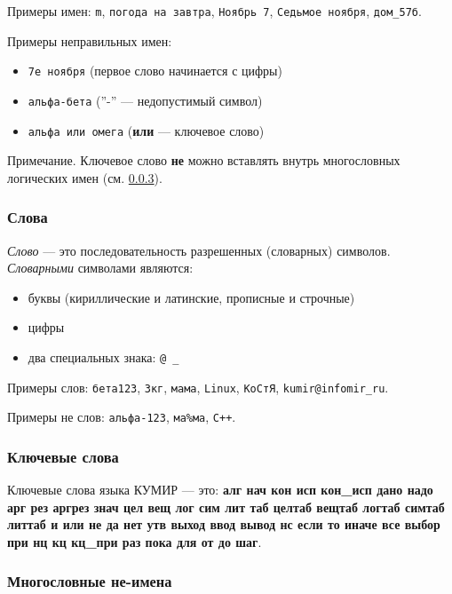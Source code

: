 \documentclass[12pt,a4paper]{article}
\begin{document}
Примеры имен: \texttt{m}, \texttt{погода на завтра}, \texttt{Ноябрь 7}, \texttt{Седьмое ноября}, \texttt{дом\_57б}.

	Примеры неправильных имен:
\begin{itemize}
\item \texttt{7е ноября} (первое слово начинается с цифры)
\item \texttt{альфа-бета} (''-'' --- недопустимый символ)
\item \texttt{альфа или омега} (\textbf{или} --- ключевое слово)
\end{itemize}

	Примечание. Ключевое слово \textbf{не} можно вставлять внутрь многословных логических имен (см. \ref{ne-names}).

\subsubsection{Слова}

	\emph{Слово} --- это последовательность разрешенных (словарных) символов. \label{ssymbols} \emph{Словарными} символами являются:
\begin{itemize}
\item буквы (кириллические и латинские, прописные и строчные)
\item цифры
\item два специальных знака: \texttt{@ \_}
\end{itemize}
	
	Примеры слов: \texttt{бета123}, \texttt{3кг}, \texttt{мама}, \texttt{Linux}, \texttt{КоСтЯ}, \texttt{kumir@infomir\_ru}.

	Примеры не слов: \texttt{альфа-123}, \texttt{ма\%ма}, \texttt{С++}.

\subsubsection{Ключевые слова}

	Ключевые слова языка КУМИР --- это: \textbf{алг нач кон исп кон\_исп \textbf{дано} надо арг рез аргрез знач цел вещ лог сим лит таб целтаб вещтаб логтаб симтаб литтаб и или не да нет утв выход ввод вывод нс если то иначе все выбор при нц кц кц\_при раз пока для от до шаг}.

\subsubsection{Многословные не-имена}
\label{ne-names}
\end{document}
